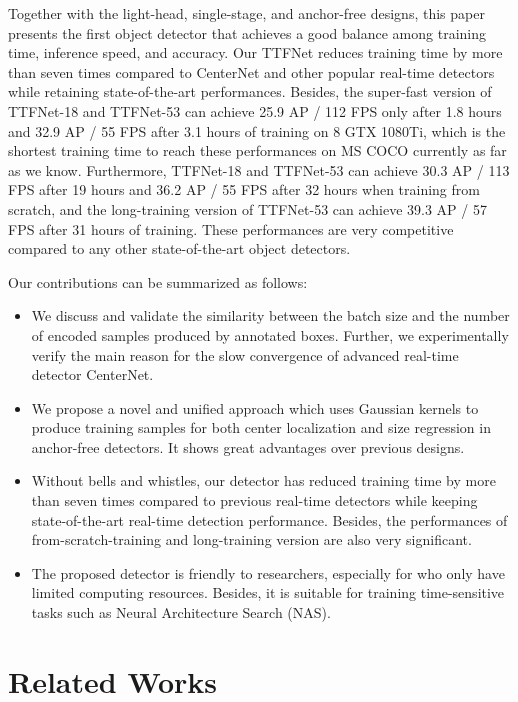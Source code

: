 \documentclass[letterpaper]{article} \usepackage{aaai20}  \usepackage{times}  \usepackage{helvet} \usepackage{courier}  \usepackage[hyphens]{url}  \usepackage{graphicx} \urlstyle{rm} \def\UrlFont{\rm}  \usepackage{graphicx}  \frenchspacing  \setlength{\pdfpagewidth}{8.5in}  \setlength{\pdfpageheight}{11in}  \usepackage{subcaption}
\begin{document}
Together with the light-head, single-stage, and anchor-free designs, this paper presents the first object detector that achieves a good balance among training time, inference speed, and accuracy. Our TTFNet reduces training time by more than seven times compared to CenterNet and other popular real-time detectors while retaining state-of-the-art performances. Besides, the super-fast version of TTFNet-18 and TTFNet-53 can achieve 25.9 AP / 112 FPS only after 1.8 hours and 32.9 AP / 55 FPS after 3.1 hours of training on 8 GTX 1080Ti, which is the shortest training time to reach these performances on MS COCO currently as far as we know. Furthermore, TTFNet-18 and TTFNet-53 can achieve 30.3 AP / 113 FPS after 19 hours and 36.2 AP / 55 FPS after 32 hours when training from scratch, and the long-training version of TTFNet-53 can achieve 39.3 AP / 57 FPS after 31 hours of training. These performances are very competitive compared to any other state-of-the-art object detectors.

Our contributions can be summarized as follows:
\begin{itemize}
\item We discuss and validate the similarity between the batch size and the number of encoded samples produced by annotated boxes. Further, we experimentally verify the main reason for the slow convergence of advanced real-time detector CenterNet.
\item We propose a novel and unified approach which uses Gaussian kernels to produce training samples for both center localization and size regression in anchor-free detectors. It shows great advantages over previous designs.
\item Without bells and whistles, our detector has reduced training time by more than seven times compared to previous real-time detectors while keeping state-of-the-art real-time detection performance. Besides, the performances of from-scratch-training and long-training version are also very significant.
\item The proposed detector is friendly to researchers, especially for who only have limited computing resources. Besides, it is suitable for training time-sensitive tasks such as Neural Architecture Search (NAS).
\end{itemize}

\section{Related Works}
\end{document}
